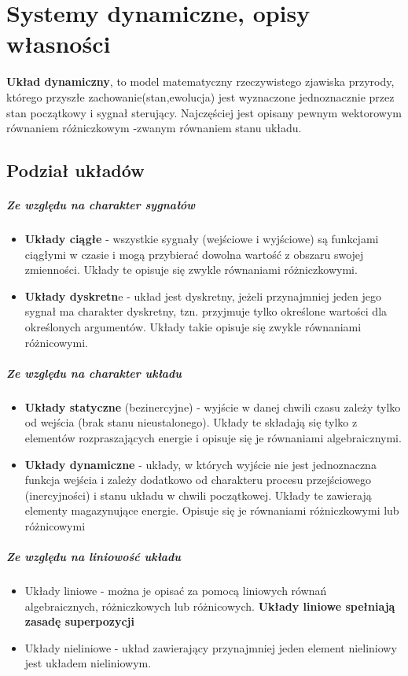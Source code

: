 \documentclass[a4paper,twoside]{report}
\begin{document}
\chapter{Systemy dynamiczne, opisy własności}

\textbf{Układ dynamiczny}, to model matematyczny rzeczywistego zjawiska przyrody, którego przyszłe zachowanie(stan,ewolucja) jest wyznaczone jednoznacznie przez stan początkowy i sygnał sterujący. Najczęściej jest opisany pewnym wektorowym równaniem różniczkowym -zwanym równaniem stanu układu. 
\section{Podział układów}
\paragraph{Ze względu na charakter sygnałów}
\begin{itemize}
	\item \textbf{Układy ciągłe }- wszystkie sygnały (wejściowe i wyjściowe) są funkcjami ciągłymi w czasie i mogą
	przybierać dowolna wartość z obszaru swojej zmienności. Układy te opisuje się zwykle równaniami różniczkowymi.
	\item \textbf{Układy dyskretn}e - układ jest dyskretny, jeżeli przynajmniej jeden jego sygnał ma charakter dyskretny,
	tzn. przyjmuje tylko określone wartości dla określonych argumentów. Układy takie opisuje się zwykle równaniami
	różnicowymi.
\end{itemize}
\paragraph{Ze względu na charakter układu}
\begin{itemize}
	\item \textbf{Układy statyczne} (bezinercyjne) - wyjście w
	danej chwili czasu zależy tylko od wejścia (brak
	stanu nieustalonego). Układy te składają się
	tylko z elementów rozpraszających energie i
	opisuje się je równaniami algebraicznymi.
	\item \textbf{Układy dynamiczne} - układy, w których wyjście
	nie jest jednoznaczna funkcja wejścia i zależy
	dodatkowo od charakteru procesu
	przejściowego (inercyjności) i stanu układu w
	chwili początkowej. Układy te zawierają
	elementy magazynujące energie. Opisuje się je
	równaniami różniczkowymi lub różnicowymi
\end{itemize}  
\paragraph{Ze względu na liniowość układu}
\begin{itemize}
	\item Układy liniowe - można je opisać za pomocą liniowych równań
	algebraicznych, różniczkowych lub różnicowych.
	\textbf{Układy liniowe spełniają zasadę superpozycji}
	\item Układy nieliniowe - układ zawierający przynajmniej jeden element
	nieliniowy jest układem nieliniowym.
\end{itemize}
\end{document}
